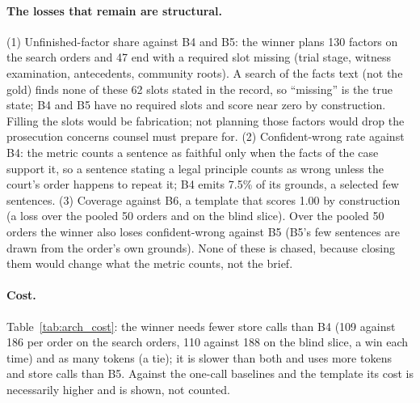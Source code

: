 \paragraph{The losses that remain are structural.} (1) Unfinished-factor share against B4 and B5: the winner plans 130 factors on the search orders and 47 end with a required slot missing (trial stage, witness examination, antecedents, community roots). A search of the facts text (not the gold) finds none of these 62 slots stated in the record, so ``missing'' is the true state; B4 and B5 have no required slots and score near zero by construction. Filling the slots would be fabrication; not planning those factors would drop the prosecution concerns counsel must prepare for. (2) Confident-wrong rate against B4: the metric counts a sentence as faithful only when the facts of the case support it, so a sentence stating a legal principle counts as wrong unless the court's order happens to repeat it; B4 emits 7.5\% of its grounds, a selected few sentences. (3) Coverage against B6, a template that scores 1.00 by construction (a loss over the pooled 50 orders and on the blind slice). Over the pooled 50 orders the winner also loses confident-wrong against B5 (B5's few sentences are drawn from the order's own grounds). None of these is chased, because closing them would change what the metric counts, not the brief.


\paragraph{Cost.} Table~\ref{tab:arch_cost}: the winner needs fewer store calls than B4 (109 against 186 per order on the search orders, 110 against 188 on the blind slice, a win each time) and as many tokens (a tie); it is slower than both and uses more tokens and store calls than B5. Against the one-call baselines and the template its cost is necessarily higher and is shown, not counted.


